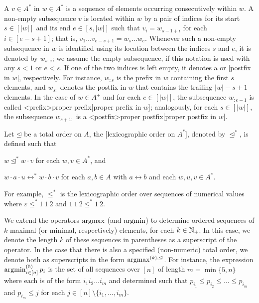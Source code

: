\documentclass[../document.tex]{subfiles}
\begin{document}
    A  \(v \in A^*\) in \(w\in A^*\) is a sequence of elements occurring consecutively within \(w\).
    A non-empty subsequence \(v\) is located within \(w\) by a pair of indices for its start \(s \in [|w|]\) and its end \(e \in [s,|w|]\) such that \(v_i = w_{s-1+i}\) for each \(i \in [e-s+1]\); that is, \(v_1 \ldots v_{e-s+1} = w_s \ldots w_e\).
    Whenever such a non-empty subsequence in \(w\) is identified using its location between the indices \(s\) and \(e\), it is denoted by \(w_{s:e}\); we assume the empty subsequence, if this notation is used with any \(s < 1\) or \(e < s\).
    If one of the two indices is left empty, it denotes a  or [postfix in \(w\)], respectively.
    For instance, \(w_{:s}\) is the prefix in \(w\) containing the first \(s\) elements, and \(w_{s:}\) denotes the postfix in \(w\) that contains the trailing \(|w|-s+1\) elements.
    In the case of \(w\in A^+\) and for each \(e \in [|w|]\), the subsequence \(w_{:e-1}\) is called <prefix>{proper prefix}[proper prefix in \(w\)]; analogously, for each \(s\in [|w|]\), the subsequence \(w_{s+1:}\) is a <postfix>{proper postfix}[proper postfix in \(w\)].

    Let \(\unlhd\) be a total order on \(A\), the [lexicographic order on \(A^*\)], denoted by \(\unlhd^*\), is defined such that
    \begin{inparaenum}
        \item \(w \unlhd^* w \cdot v\) for each \(w, v \in A^*\), and
        \item \(w\cdot a\cdot u \rel^* w\cdot b\cdot v \) for each \(a,b \in A\) with \(a \rel b\) and each \(w,u,v \in A^*\).
    \end{inparaenum}
    For example, \(\leq^*\) is the lexicographic order over sequences of numerical values where \(\varepsilon \leq^* 1\:1\:2\) and \(1\:1\:2\leq^*1\:2\).
    
    We extend the operators \(\operatorname{arg max}\) (and \(\operatorname{arg min}\)) to determine ordered sequences of \(k\) maximal (or minimal, respectively) elements, for each \(k \in \mathbb{N}_+\).
    In this case, we denote the length \(k\) of these sequences in parentheses as a superscript of the operator.
    In the case that there is also a specified (non-numeric) total order, we denote both as superscripts in the form \(\operatorname{arg max}^{(k), \unlhd}\).
    For instance, the expression \(\operatorname{arg min}^{(5)}_{i \in [n]} p_i\) is the set of all sequences over \([n]\) of length \(m = \min \{5, n\}\) where each is of the form \(i_1 i_2 \ldots i_m\) and determined such that \(p_{i_1} \leq p_{i_2} \leq \ldots \leq p_{i_m}\) and \(p_{i_m} \leq j\) for each \(j \in [n]\setminus\{i_1,\ldots,i_m\}\).
\end{document}
